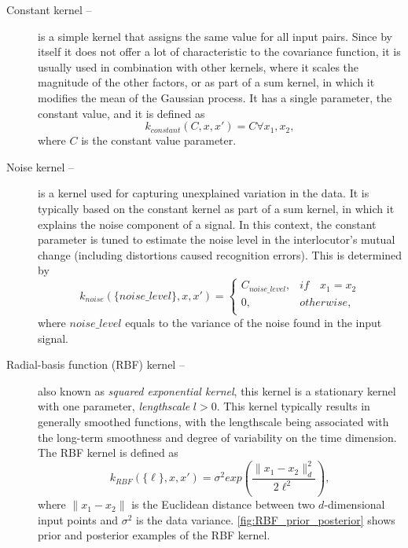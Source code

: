 \begin{description}
	\item[Constant kernel -- ]
	is a simple kernel that assigns the same value for all input pairs.
	Since by itself it does not offer a lot of characteristic to the covariance function, it is usually used in combination with other kernels, where it scales the magnitude of the other factors, or as part of a sum kernel, in which it modifies the mean of the Gaussian process.
	It has a single parameter, the constant value, and it is defined as 
	\begin{equation}
		\label{eq:constant_kernel}
		k_{constant}(C, x, x') = C\forall x_1, x_2,
	\end{equation}
	where $C$ is the constant value parameter.
	
	\item[Noise kernel -- ]
	is a kernel used for capturing unexplained variation in the data.
	It is typically based on the constant kernel as part of a sum kernel, in which it explains the noise component of a signal.
	In this context, the constant parameter is tuned to estimate the noise level in the interlocutor's mutual change (including distortions caused recognition errors).
	This is determined by
	\begin{equation}
		\label{eq:noise_kernel}
		k_{noise}(\{noise\_level\}, x, x') =
		\begin{cases}
		C_{noise\_level}, & if\quad x_1 = x_2\\
		0, & otherwise,\\
		\end{cases}
	\end{equation}
	where $noise\_level$ equals to the variance of the noise found in the input signal.
	
	\item[Radial-basis function (RBF) kernel --]
	also known as \emph{squared exponential kernel}, this kernel is a stationary kernel with one parameter, \emph{lengthscale} $l > 0$.
	This kernel typically results in generally smoothed functions, with the lengthscale being associated with the long-term smoothness and degree of variability on the time dimension.
	The RBF kernel is defined as
	\begin{equation}
		\label{eq:RBF_kernel}
		k_{RBF}(\{\ell\}, x, x') = \sigma^2 exp\left(\frac{\lVert x_1 - x_2 \lVert ^2_d}{2\ell^2}\right),
	\end{equation}
	where $\lVert x_1 - x_2 \lVert$ is the Euclidean distance between two $d$-dimensional input points and $\sigma^2$ is the data variance.
	\cref{fig:RBF_prior_posterior} shows prior and posterior examples of the RBF kernel.
	

\end{description}
